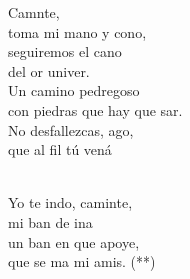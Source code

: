 \begin{cancion}[Caminante][]%
	Camnte,\\
	toma mi mano y cono,\\
	seguiremos el cano\\
	del or univer.\\
Un camino pedregoso\\
	con piedras que hay que sar.\\
	No desfallezcas, ago,\\
	que al fil tú vená\\\jump\\
	\begin{chorus}%
	Yo te indo, caminte,\\
	mi ban de ina\\
	un ban en que apoye, \\
	que se ma mi amis. (**)\\
	\end{chorus}%
	\jump\\
\end{cancion}%
